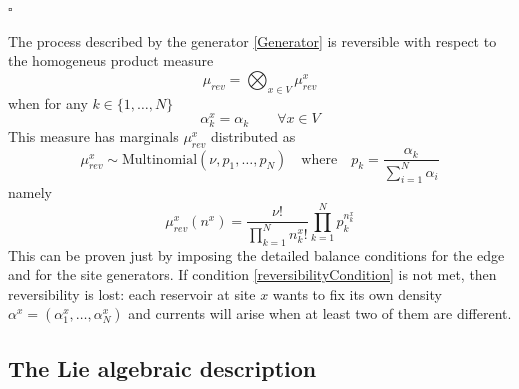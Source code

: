 \documentclass[11pt]{article}
\numberwithin{equation}{section}
\numberwithin{equation}{subsection}
\newcommand{\twoj}{\nu}
\begin{document}
    \begin{flushright}
        $\square$
    \end{flushright}
The process described by the generator \eqref{Generator} is reversible with respect to the homogeneus product measure \begin{equation}\label{reversibleMeasure}
\mu_{rev}=\bigotimes_{x\in V}\mu_{rev}^{x}
\end{equation}
when for any $k\in\{1,\ldots,N\}$
\begin{equation}\label{reversibilityCondition}
\alpha_{k}^{x}=\alpha_{k}\qquad \forall x\in V
\end{equation}
This measure has marginals $\mu_{rev}^{x}$ distributed as 
\begin{equation}
 \mu^{x}_{rev}\sim \text{Multinomial}\left(\twoj,p_{1},\ldots,p_{N}\right)\quad \text{where}\quad p_{k}=\frac{\alpha_{k}}{\sum_{i=1}^{N}\alpha_{i}}
\end{equation}
namely
\begin{equation}
\mu_{rev}^{x}(n^{x})=\frac{\nu!}{\prod_{k=1}^{N}n_{k}^{x}!}\prod_{k=1}^{N}p_{k}^{n_{k}^{x}}
\end{equation}
This can be proven just by imposing the detailed balance conditions for the edge and for the site generators. If condition \eqref{reversibilityCondition} is not met, then reversibility is lost: each reservoir at site $x$ wants to fix its own density $\alpha^{x}=(\alpha_{1}^{x},\ldots,\alpha_{N}^{x})$ and currents will arise when at least two of them are different. 
\subsection{The Lie algebraic description}
\end{document}
